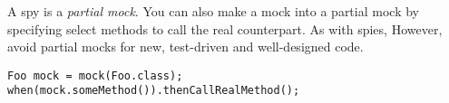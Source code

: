 \documentclass[8pt, table, xcdraw]{article}%
\begin{document}
A spy is a \emph{partial mock}. You can also make a mock into a partial mock by specifying select methods to call the real counterpart. As with spies, However, avoid partial mocks for new, test-driven and well-designed code.

\begin{lstlisting}
Foo mock = mock(Foo.class);
when(mock.someMethod()).thenCallRealMethod();
\end{lstlisting}

\end{document}
